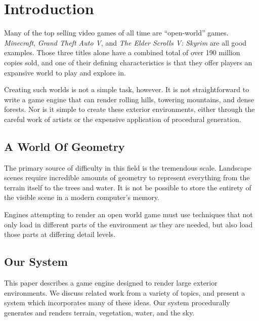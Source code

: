 
\chapter{Introduction}


Many of the top selling video games of all time are ``open-world'' games.
{\em Minecraft}, {\em Grand Theft Auto V}, and {\em The Elder Scrolls V: Skyrim} are all good examples.
Those three titles alone have a combined total of over 190 million copies sold, and one of their defining characteristics is that they offer players an expansive world to play and explore in.

Creating such worlds is not a simple task, however.
It is not straightforward to write a game engine that can render rolling hills, towering mountains, and dense forests.
Nor is it simple to create these exterior environments, either through the careful work of artists or the expensive application of procedural generation.


\section{A World Of Geometry}

The primary source of difficulty in this field is the tremendous scale.
Landscape scenes require incredible amounts of geometry to represent everything from the terrain itself to the trees and water.
It is not be possible to store the entirety of the visible scene in a modern computer's memory.

Engines attempting to render an open world game must use techniques that not only load in different parts of the environment as they are needed, but also load those parts at differing detail levels.


\section{Our System}

This paper describes a game engine designed to render large exterior environments.
We discuss related work from a variety of topics, and present a system which incorporates many of these ideas.
Our system procedurally generates and renders terrain, vegetation, water, and the sky.
